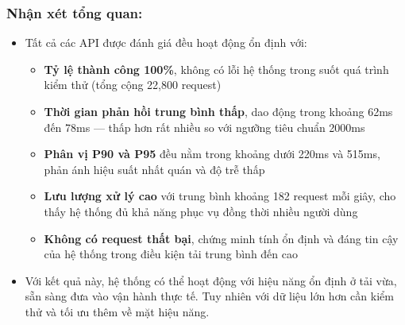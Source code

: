 \subsubsection*{Nhận xét tổng quan:}
\begin{itemize}[label=--]
\item Tất cả các API được đánh giá đều hoạt động ổn định với:
\begin{itemize}[label=\textbullet]
\item \textbf{Tỷ lệ thành công 100\%}, không có lỗi hệ thống trong suốt quá trình kiểm thử (tổng cộng 22,800 request)
\item \textbf{Thời gian phản hồi trung bình thấp}, dao động trong khoảng 62ms đến 78ms — thấp hơn rất nhiều so với ngưỡng tiêu chuẩn 2000ms
\item \textbf{Phân vị P90 và P95} đều nằm trong khoảng dưới 220ms và 515ms, phản ánh hiệu suất nhất quán và độ trễ thấp
\item \textbf{Lưu lượng xử lý cao} với trung bình khoảng 182 request mỗi giây, cho thấy hệ thống đủ khả năng phục vụ đồng thời nhiều người dùng
\item \textbf{Không có request thất bại}, chứng minh tính ổn định và đáng tin cậy của hệ thống trong điều kiện tải trung bình đến cao
\end{itemize}
\item Với kết quả này, hệ thống có thể hoạt động với hiệu năng ổn định ở tải vừa, sẵn sàng đưa vào vận hành thực tế. Tuy nhiên với dữ liệu lớn hơn cần kiểm thử và tối ưu thêm về mặt hiệu năng.
\end{itemize}


